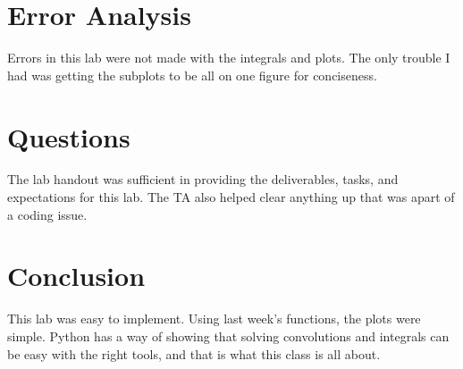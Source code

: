 \documentclass[12pt]{report}
\begin{document}
\clearpage
\section{Error Analysis}
\noindent  Errors in this lab were not made with the integrals and plots. The only trouble I had was getting the subplots to be all on one figure for conciseness. 

\section{Questions}
\noindent The lab handout was sufficient in providing the deliverables, tasks, and expectations for this lab. The TA also helped clear anything up that was apart of a coding issue. 

\section{Conclusion}
This lab was easy to implement. Using last week's functions, the plots were simple. Python has a way of showing that solving convolutions and integrals can be easy with the right tools, and that is what this class is all about. 
\end{document}
